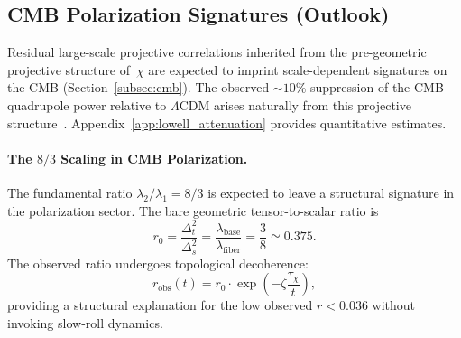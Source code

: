 \subsection{CMB Polarization Signatures (Outlook)}
  \label{subsec:cmb-polarization-signatures}

  Residual large-scale projective correlations inherited from the
  pre-geometric projective structure of~$\chi$ are expected to imprint
  scale-dependent signatures on the CMB
  (Section~\ref{subsec:cmb}).
  The observed $\sim 10\%$ suppression of the CMB quadrupole power relative
  to $\Lambda$CDM arises naturally from this projective structure~\cite{Aghanim2020}.
  Appendix~\ref{app:lowell_attenuation} provides quantitative estimates.

  \paragraph{The \texorpdfstring{$8/3$}{8/3} Scaling in CMB Polarization.}
    \label{subsec:cmb_8_3_scaling}
    The fundamental ratio $\lambda_2/\lambda_1 = 8/3$ is expected to leave a
    structural signature in the polarization sector.
    The bare geometric tensor-to-scalar ratio is
    \begin{equation}
      r_0
      = \frac{\Delta_t^2}{\Delta_s^2}
      = \frac{\lambda_{\text{base}}}{\lambda_{\text{fiber}}}
      = \frac{3}{8} \simeq 0.375 .
    \end{equation}
    The observed ratio undergoes topological decoherence:
    \begin{equation}
      r_{\text{obs}}(t)
      = r_0 \cdot \exp\!\left(
                          -\zeta \frac{\tau_\chi}{t} \right),
    \end{equation}
    providing a structural explanation for the low observed $r < 0.036$
    without invoking slow-roll dynamics.
